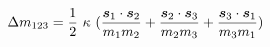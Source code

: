 \begin{equation}
\Delta m_{123} = \frac{1}{2}~ \kappa~ (\frac{\mbox{\boldmath$s$}_1 \cdot \mbox{\boldmath$s$}_2}{m_1 m_2}+
\frac{\mbox{\boldmath$s$}_2 \cdot \mbox{\boldmath$s$}_3}{m_2 m_3} +
\frac{\mbox{\boldmath$s$}_3 \cdot \mbox{\boldmath$s$}_1}{m_3 m_1})
\end{equation}

